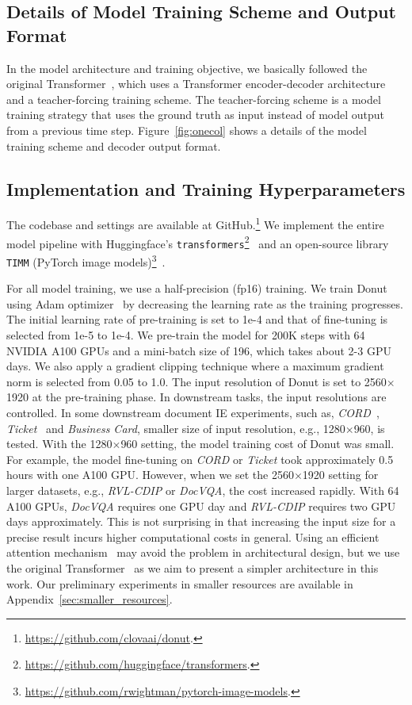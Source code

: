 \documentclass[runningheads]{llncs}
\newcommand\ours{{{\mbox{Donut}}}\xspace}
\begin{document}
\subsection{Details of Model Training Scheme and Output Format}\label{sec:detail_of_scheme_and_format}
In the model architecture and training objective, we basically followed the original Transformer~\cite{vaswani2017transformer}, which uses a Transformer encoder-decoder architecture and a teacher-forcing training scheme.
The teacher-forcing scheme is a model training strategy that uses the ground truth as input instead of model output from a previous time step.
Figure~\ref{fig:onecol} shows a details of the model training scheme and decoder output format.

\subsection{Implementation and Training Hyperparameters}\label{sec:detail_of_implementation_and_hyperparams}
The codebase and settings are available at GitHub.\footnote{\url{https://github.com/clovaai/donut}.}
We implement the entire model pipeline with Huggingface's \texttt{transformers}\footnote{\url{https://github.com/huggingface/transformers}.}~\cite{wolf-etal-2020-transformers} and an open-source library \texttt{TIMM} (PyTorch image models)\footnote{\url{https://github.com/rwightman/pytorch-image-models}.}~\cite{rw2019timm}.

For all model training, we use a half-precision (fp16) training.
We train \ours using Adam optimizer~\cite{Adamoptim} by decreasing the learning rate as the training progresses.
The initial learning rate of pre-training is set to 1e-4 and that of fine-tuning is selected from 1e-5 to 1e-4.
We pre-train the model for 200K steps with 64 NVIDIA A100 GPUs and a mini-batch size of 196,
which takes about 2-3 GPU days.
We also apply a gradient clipping technique where a maximum gradient norm is selected from 0.05 to 1.0.
The input resolution of \ours is set to 2560$\times$1920 at the pre-training phase.
In downstream tasks, the input resolutions are controlled.
In some downstream document IE experiments, such as, \textit{CORD}~\cite{park2019cord}, \textit{Ticket}~\cite{eaten} and \textit{Business Card}, smaller size of input resolution, e.g., 1280$\times$960, is tested.
With the 1280$\times$960 setting, the model training cost of \ours was small.
For example, the model fine-tuning on \textit{CORD} or \textit{Ticket} took approximately 0.5 hours with one A100 GPU. However, when we set the 2560$\times$1920 setting for larger datasets, e.g., \textit{RVL-CDIP} or \textit{DocVQA}, the cost increased rapidly. With 64 A100 GPUs, \textit{DocVQA} requires one GPU day and \textit{RVL-CDIP} requires two GPU days approximately. This is not surprising in that increasing the input size for a precise result incurs higher computational costs in general. Using an efficient attention mechanism~\cite{wang2020linformer} may avoid the problem in architectural design, but we use the original Transformer~\cite{vaswani2017transformer} as we aim to present a simpler architecture in this work. Our preliminary experiments in smaller resources are available in Appendix~\ref{sec:smaller_resources}.
\end{document}

